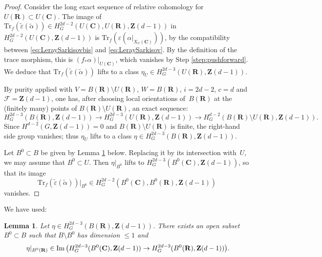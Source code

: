 \documentclass[JEP,XML,SOM,Unicode]{cedram}
\theoremstyle{plain}
\newtheorem{lem}[thm]{Lemma}
\theoremstyle{definition}
\numberwithin{equation}{section}
\renewcommand{\C}{{\mathbf C}}
\newcommand{\R}{{\mathbf R}}
\newcommand{\Z}{{\mathbf Z}}
\newcommand{\Trf}{\mathrm{Tr}_f}
\newcommand{\Ima}{{\mathrm{Im}}}
\begin{document}
\begin{proof}
Consider the long exact sequence of relative cohomology for $U(\R)\subset U(\C)$.
The image of
$\Trf(\tilde{\varepsilon}(\tilde{\alpha}))\in H^{2d-2}_G(U(\C),U(\R),\Z(d-1))$ in $H^{2d-2}_G(U(\C),\Z(d-1))$ is $\Trf(\varepsilon(\alpha|_{X_U(\C)}))$, by the compatibility between \eqref{eq:LeraySarkisovbis} and \eqref{eq:LeraySarkisov}. By the definition of the trace morphism, this is $(f_*\alpha)|_{U(\C)}$, which vanishes by Step \ref{step:pushforward}.
We deduce that $\Trf(\tilde{\varepsilon}(\tilde{\alpha}))$ lifts to a class $\eta_U\in H^{2d-3}_G(U(\R),\Z(d-1))$.

By purity \cite[(\ref*{BW1-eq:equivariant purity})]{BW1} applied with $V=B(\R)\setminus U(\R)$, $W=B(\R)$, $i=2d-2$, $c=d$ and $\mathscr{F}=\Z(d-1)$, one has, after choosing local orientations of~$B(\R)$ at the
(finitely many) points of $B(\R)\setminus U(\R)$, an exact sequence:
\[
H^{2d-3}_G(B(\R),\Z(d-1))\to H^{2d-3}_G(U(\R),\Z(d-1))\to H^{d-2}_G(B(\R)\setminus U(\R),\Z(d-1)).
\]
Since $H^{d-2}(G,\Z(d-1))=0$ and $B(\R)\setminus U(\R)$ is finite, the right-hand side group vanishes; thus $\eta_U$ lifts to a class $\eta\in H^{2d-3}_G(B(\R),\Z(d-1))$.

Let $B^0\subset B$ be given by Lemma \ref{lem:AKhomology} below. Replacing it by its intersection with~$U$, we may assume that $B^0\subset U$.
Then $\eta|_{B^0}$ lifts to $H^{2d-3}_G(B^0(\C),\Z(d-1))$, so that its image
\[
\Trf(\tilde{\varepsilon}(\tilde{\alpha}))|_{B^0}\in H^{2d-2}_G(B^0(\C),B^0(\R),\Z(d-1))
\]
vanishes.
\end{proof}

We have used:

\begin{lem}
\label{lem:AKhomology}
Let $\eta\in H^{2d-3}_G(B(\R),\Z(d-1))$. There exists an open subset $B^0\subset B$ such that $B\setminus B^0$ has dimension $\leq 1$ and
\[
\eta|_{B^0(\R)}\in \Ima \left(H^{2d-3}_G(B^0(\C),\Z(d-1))\to H^{2d-3}_G(B^0(\R),\Z(d-1))\right)\mkern-3mu\rlap{.}
\]
\end{lem}
\end{document}
